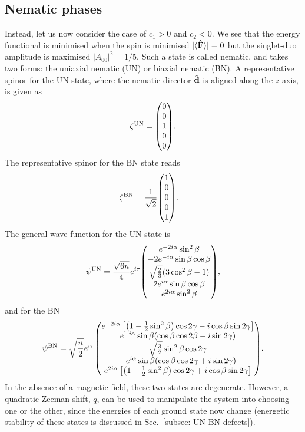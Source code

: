 \subsection{Nematic phases}
Instead, let us now consider the case of \(c_1 > 0\) and \(c_2 < 0\).
We see that the energy functional is minimised when the spin is minimised
\(|\langle \hat{\vb{F}} \rangle | = 0\) but the singlet-duo amplitude is maximised
\(|A_{00}|^2 = 1/5\).
Such a state is called nematic, and takes two forms: the uniaxial nematic (UN)
or biaxial nematic (BN).
A representative spinor for the UN state, where the nematic director
\(\hat{\vb{d}}\) is aligned along the \(z\)-axis, is given as
\begin{align}\label{eq: UN-spinor}
    \zeta^\mathrm{UN} = \mqty(0 \\ 0 \\ 1 \\ 0 \\ 0).
\end{align}
The representative spinor for the BN state reads
\begin{align}\label{eq: BN-spinor}
    \zeta^\mathrm{BN} &= \frac{1}{\sqrt{2}}\mqty(1 \\ 0 \\0 \\ 0 \\ 1).
\end{align}
The general wave function for the UN state is
\begin{equation}\label{eq: UN-representative-spinor}
    \psi^\mathrm{UN} = \frac{\sqrt{6n}}{4}e^{i\tau}\mqty(
    e^{-2i\alpha} \sin^2\beta \\
    -2e^{-i\alpha} \sin\beta \cos\beta \\
    \sqrt{\frac{2}{3}}(3\cos^2\beta - 1) \\
    2e^{i\alpha} \sin\beta \cos\beta \\
    e^{2i\alpha} \sin^2\beta
    ),
\end{equation}
and for the BN
\begin{equation}\label{eq: BN-representative-spinor}
    \psi^\mathrm{BN} = \sqrt{\frac{n}{2}}e^{i\tau} \mqty(
    e^{-2i\alpha}\left[\left(1 - \frac{1}{2}\sin^2\beta\right)\cos 2\gamma
        - i\cos\beta\sin 2\gamma\right] \\
    e^{-i\alpha}\sin\beta(\cos\beta\cos 2\beta - i\sin 2\gamma) \\
    \sqrt{\frac{3}{2}}\sin^2\beta \cos 2\gamma \\
    -e^{i\alpha}\sin\beta(\cos\beta\cos 2\gamma + i\sin 2\gamma) \\
    e^{2i\alpha}\left[\left(1 - \frac{1}{2}\sin^2\beta\right)\cos 2\gamma
        + i\cos\beta\sin 2\gamma\right]
    ).
\end{equation}
In the absence of a magnetic field, these two states are degenerate.
However, a quadratic Zeeman shift, \(q\), can be used to manipulate the system
into choosing one or the other, since the energies of each ground state now
change (energetic stability of these states is discussed in
Sec.~\ref{subsec: UN-BN-defects}).

